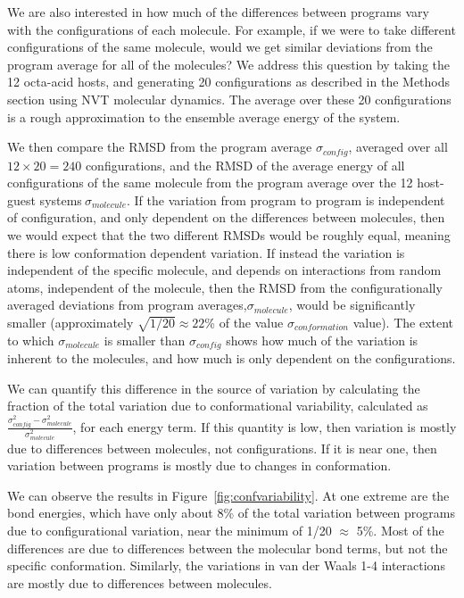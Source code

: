 We are also interested in how much of the differences between programs
vary with the configurations of each molecule. For example, if we were
to take different configurations of the same molecule, would we get
similar deviations from the program average for all of the molecules?
We address this question by taking the 12 octa-acid hosts, and generating
20 configurations as described in the Methods section using NVT
molecular dynamics. The average over these 20 configurations is a rough approximation to the ensemble average energy of the
system.

We then compare the RMSD from the program average $\sigma_{config}$,
averaged over all $12 \times 20 = 240$ configurations, and the RMSD of
the average energy of all configurations of the same molecule from the
program average over the 12 host-guest systems$~\sigma_{molecule}$. If
the variation from program to program is independent of configuration,
and only dependent on the differences between molecules, then we would
expect that the two different RMSDs would be roughly equal, meaning
there is low conformation dependent variation.  If instead the
variation is independent of the specific molecule, and depends on
interactions from random atoms, independent of the molecule, then the
RMSD from the configurationally averaged deviations from program
averages,$\sigma_{molecule}$, would be significantly smaller
(approximately $\sqrt{1/20} \approx 22$\% of the value
$\sigma_{conformation}$ value).
The extent to which $\sigma_{molecule}$ is smaller than
$\sigma_{config}$ shows how much of the variation is inherent to the
molecules, and how much is only dependent on the configurations.

We can quantify this difference in the source of variation by
calculating the fraction of the total variation due to conformational
variability, calculated as
$\frac{\sigma^2_{config}-\sigma^2_{molecule}}{\sigma^2_{molecule}}$,
for each energy term. If this quantity is low, then variation is
mostly due to differences between molecules, not configurations.  If
it is near one, then variation between programs is mostly due to
changes in conformation.

We can observe the results in Figure~\ref{fig:confvariability}. At one
extreme are the bond energies, which have only about 8\% of the total
variation between programs due to configurational variation, near the
minimum of 1/20 $\approx$ 5\%. Most of the differences are due to
differences between the molecular bond terms, but not the specific
conformation.  Similarly, the variations in van der Waals 1-4
interactions are mostly due to differences between molecules.

